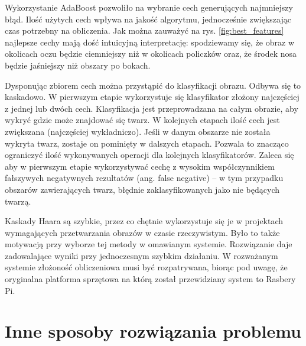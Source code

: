 \documentclass[oneside, eng]{mgr}
\begin{document}
Wykorzystanie AdaBoost pozwoliło na wybranie cech generujących najmniejszy błąd. Ilość użytych cech wpływa na jakość algorytmu, jednocześnie zwiększając czas potrzebny na obliczenia. Jak można zauważyć na rys. \ref{fig:best_features} najlepsze cechy mają dość intuicyjną interpretację: spodziewamy się, że obraz w okolicach oczu będzie ciemniejszy niż w okolicach policzków oraz, że środek nosa będzie jaśniejszy niż obszary po bokach.

Dysponując zbiorem cech można przystąpić do klasyfikacji obrazu. Odbywa się to kaskadowo. W pierwszym etapie wykorzystuje się klasyfikator złożony najczęściej z jednej lub dwóch cech. Klasyfikacja jest przeprowadzana na całym obrazie, aby wykryć gdzie może znajdować się twarz. W kolejnych etapach ilość cech jest zwiększana (najczęściej wykładniczo). Jeśli w danym obszarze nie została wykryta twarz, zostaje on pominięty w dalszych etapach. Pozwala to znacząco ograniczyć ilość wykonywanych operacji dla kolejnych klasyfikatorów. Zaleca się aby w pierwszym etapie wykorzystywać cechę z wysokim współczynnikiem fałszywych negatywnych rezultatów (ang. false negative) -- w tym przypadku obszarów zawierających twarz, błędnie zaklasyfikowanych jako nie będących twarzą.

Kaskady Haara są szybkie, przez co chętnie wykorzystuje się je w projektach wymagających przetwarzania obrazów w czasie rzeczywistym. Było to także motywacją przy wyborze tej metody w omawianym systemie. Rozwiązanie daje zadowalające wyniki przy jednoczesnym szybkim działaniu. W rozważanym systemie złożoność obliczeniowa musi być rozpatrywana, biorąc pod uwagę, że oryginalna platforma sprzętowa na którą został przewidziany system to Rasbery Pi.

\section{Inne sposoby rozwiązania problemu} \label{geometrical_features}
\end{document}
